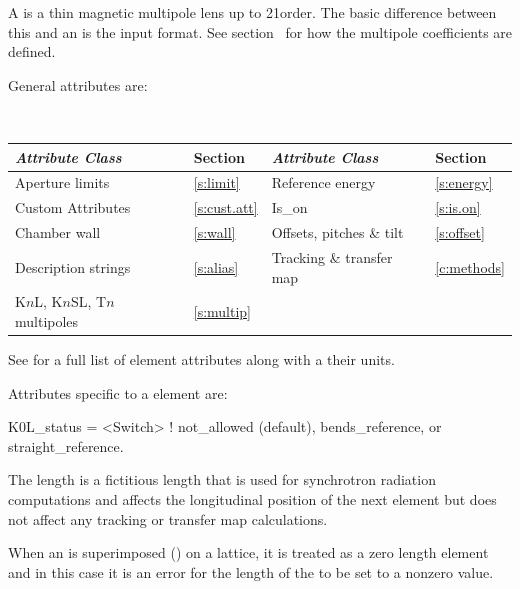 {A  is a thin magnetic multipole lens up to 21\St order. The basic
difference between this and an  is the input
format. See section~ for how the multipole coefficients
are defined.

General  attributes are:
\begin{center}
\tt 
\begin{tabular}{llll} \toprule
  {\sl Attribute Class}          & Section           & {\sl Attribute Class}      & Section         \\ \midrule
  Aperture limits                & \ref{s:limit}     & Reference energy           & \ref{s:energy}  \\
  Custom Attributes              & \ref{s:cust.att}  & Is_on                      & \ref{s:is.on}   \\ 
  Chamber wall                   & \ref{s:wall}      & Offsets, pitches \& tilt   & \ref{s:offset}  \\
  Description strings            & \ref{s:alias}     & Tracking \& transfer map   & \ref{c:methods} \\ 
  K$n$L, K$n$SL, T$n$ multipoles & \ref{s:multip}    &                            &                 \\
  \bottomrule
\end{tabular}
\end{center}
\toffset
See  for a full list of element attributes along with a their units.

Attributes specific to a  element are:
\begin{example}
  K0L_status      = <Switch> ! not_allowed (default), bends_reference, or straight_reference.
\end{example}

The length  is a fictitious length that is used for synchrotron
radiation computations and affects the longitudinal position of the
next element but does not affect any tracking or transfer map
calculations.

When an  is superimposed () on a lattice, it is
treated as a zero length element and in this case it is an error for the length
of the  to be set to a nonzero value.

}
